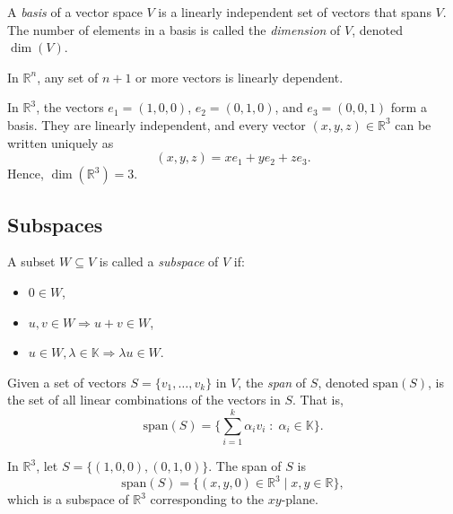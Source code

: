 \begin{definition}
A \emph{basis} of a vector space $V$ is a linearly independent set of vectors that spans $V$.  
The number of elements in a basis is called the \emph{dimension} of $V$, denoted $\dim(V)$.
\end{definition}

\begin{theorem}
In $\mathbb{R}^n$, any set of $n+1$ or more vectors is linearly dependent.
\end{theorem}

\begin{example}
In $\mathbb{R}^3$, the vectors $e_1=(1,0,0)$, $e_2=(0,1,0)$, and $e_3=(0,0,1)$ form a basis.  
They are linearly independent, and every vector $(x,y,z) \in \mathbb{R}^3$ can be written uniquely as 
\[
(x,y,z) = x e_1 + y e_2 + z e_3.
\]
Hence, $\dim(\mathbb{R}^3)=3$.
\end{example}

\subsection{Subspaces}

\begin{definition}[Subspace]
A subset $W \subseteq V$ is called a \emph{subspace} of $V$ if:
\begin{itemize}
    \item $0 \in W$,
    \item $u,v \in W \Rightarrow u+v \in W$,
    \item $u \in W, \lambda \in \mathbb{K} \Rightarrow \lambda u \in W$.
\end{itemize}
\end{definition}

\begin{definition}[Span]
Given a set of vectors $S = \{v_1,\dots,v_k\}$ in $V$, the \emph{span} of $S$, denoted $\mathrm{span}(S)$, is the set of all linear combinations of the vectors in $S$.  
That is, 
\[
\mathrm{span}(S) = \Big\{ \sum_{i=1}^k \alpha_i v_i \; : \; \alpha_i \in \mathbb{K} \Big\}.
\]
\end{definition}

\begin{example}
In $\mathbb{R}^3$, let $S=\{(1,0,0), (0,1,0)\}$.  
The span of $S$ is 
\[
\mathrm{span}(S) = \{(x,y,0) \in \mathbb{R}^3 \mid x,y \in \mathbb{R}\},
\]
which is a subspace of $\mathbb{R}^3$ corresponding to the $xy$-plane.
\end{example}

